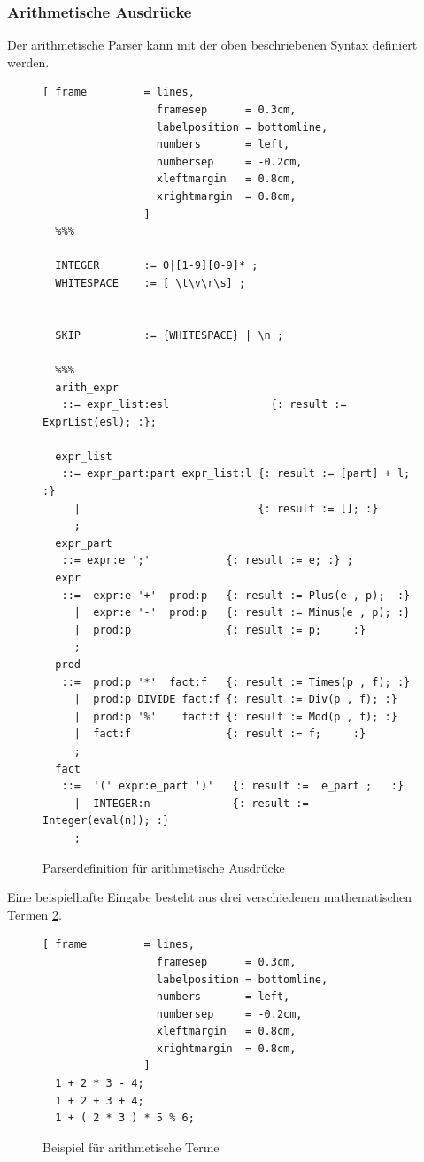 \subsubsection{Arithmetische Ausdrücke}
Der arithmetische Parser  kann mit der oben beschriebenen Syntax definiert werden.
\begin{figure}[!ht]
\begin{Verbatim}[ frame         = lines, 
                  framesep      = 0.3cm, 
                  labelposition = bottomline,
                  numbers       = left,
                  numbersep     = -0.2cm,
                  xleftmargin   = 0.8cm,
                  xrightmargin  = 0.8cm,
                ]
  %%%

  INTEGER       := 0|[1-9][0-9]* ;
  WHITESPACE    := [ \t\v\r\s] ;


  SKIP          := {WHITESPACE} | \n ;

  %%%
  arith_expr 
   ::= expr_list:esl                {: result := ExprList(esl); :};

  expr_list 
   ::= expr_part:part expr_list:l {: result := [part] + l; :} 
     |                            {: result := []; :}
     ;
  expr_part 
   ::= expr:e ';'            {: result := e; :} ;
  expr 
   ::=  expr:e '+'  prod:p   {: result := Plus(e , p);  :} 
     |  expr:e '-'  prod:p   {: result := Minus(e , p); :} 
     |  prod:p               {: result := p;     :}
     ;
  prod 
   ::=  prod:p '*'  fact:f   {: result := Times(p , f); :}
     |  prod:p DIVIDE fact:f {: result := Div(p , f); :} 
     |  prod:p '%'    fact:f {: result := Mod(p , f); :} 
     |  fact:f               {: result := f;     :}
     ;
  fact 
   ::=  '(' expr:e_part ')'   {: result :=  e_part ;   :} 
     |  INTEGER:n             {: result := Integer(eval(n)); :} 
     ;
\end{Verbatim}
\caption{Parserdefinition für arithmetische Ausdrücke}
\label{fig:example_arithmetic_grammer}
\end{figure}
%
Eine beispielhafte Eingabe besteht aus drei verschiedenen mathematischen Termen \ref{fig:example_arithmetic_input}.
\begin{figure}[!ht]
\begin{Verbatim}[ frame         = lines, 
                  framesep      = 0.3cm, 
                  labelposition = bottomline,
                  numbers       = left,
                  numbersep     = -0.2cm,
                  xleftmargin   = 0.8cm,
                  xrightmargin  = 0.8cm,
                ]
  1 + 2 * 3 - 4;
  1 + 2 + 3 + 4;
  1 + ( 2 * 3 ) * 5 % 6;
\end{Verbatim}
\caption{Beispiel für arithmetische Terme}
\label{fig:example_arithmetic_input}
\end{figure}
